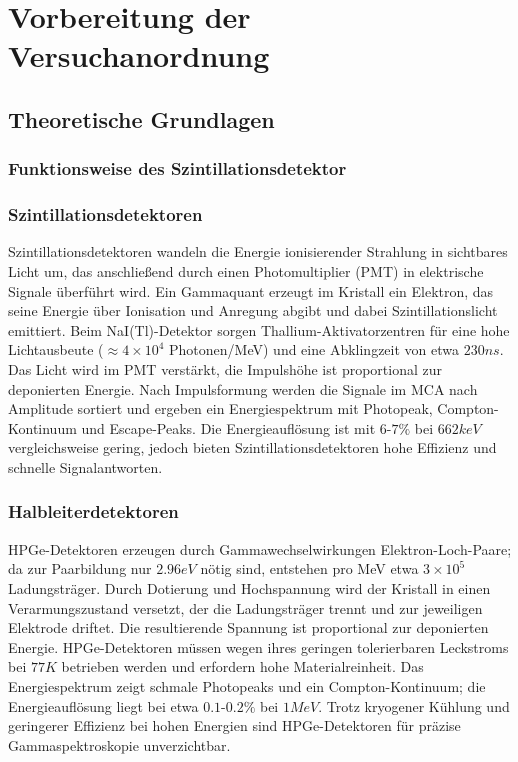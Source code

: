 \chapter{Vorbereitung der Versuchanordnung}
\section{Theoretische Grundlagen}
\subsection{Funktionsweise des Szintillationsdetektor}
\subsection*{Szintillationsdetektoren}
Szintillationsdetektoren wandeln die Energie ionisierender Strahlung in sichtbares
Licht um, das anschließend durch einen Photomultiplier (PMT) in elektrische Signale
überführt wird. Ein Gammaquant erzeugt im Kristall ein Elektron, das seine Energie
über Ionisation und Anregung abgibt und dabei Szintillationslicht emittiert. Beim
NaI(Tl)-Detektor sorgen Thallium-Aktivatorzentren für eine hohe Lichtausbeute
($\approx4\times10^4$ Photonen/MeV) und eine Abklingzeit von etwa $230ns$.
Das Licht wird im PMT verstärkt, die Impulshöhe ist proportional zur deponierten
Energie. Nach Impulsformung werden die Signale im MCA nach Amplitude sortiert und
ergeben ein Energiespektrum mit Photopeak, Compton-Kontinuum und Escape-Peaks.
Die Energieauflösung ist mit $6$-$7\%$ bei $662keV$ vergleichsweise
gering, jedoch bieten Szintillationsdetektoren hohe Effizienz und schnelle
Signalantworten.

\subsection*{Halbleiterdetektoren}
HPGe-Detektoren erzeugen durch Gammawechselwirkungen Elektron-Loch-Paare; da zur
Paarbildung nur $2.96eV$ nötig sind, entstehen pro MeV etwa
$3\times10^5$ Ladungsträger. Durch Dotierung und Hochspannung wird der Kristall in
einen Verarmungszustand versetzt, der die Ladungsträger trennt und zur jeweiligen
Elektrode driftet. Die resultierende Spannung ist proportional zur deponierten
Energie. HPGe-Detektoren müssen wegen ihres geringen tolerierbaren Leckstroms bei
$77K$ betrieben werden und erfordern hohe Materialreinheit. Das
Energiespektrum zeigt schmale Photopeaks und ein Compton-Kontinuum; die
Energieauflösung liegt bei etwa $0.1$-$0.2\%$ bei $1MeV$. Trotz
kryogener Kühlung und geringerer Effizienz bei hohen Energien sind HPGe-Detektoren
für präzise Gammaspektroskopie unverzichtbar.

